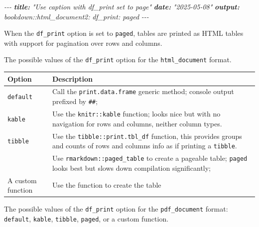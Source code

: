\documentclass[
  a4paper,
  twoside,
  openright]{book}
\newenvironment{Shaded}{\begin{snugshade}}{\end{snugshade}}
\newcommand{\AnnotationTok}[1]{\textcolor[rgb]{0.56,0.35,0.01}{\textbf{\textit{#1}}}}
\newcommand{\CommentTok}[1]{\textcolor[rgb]{0.56,0.35,0.01}{\textit{#1}}}
\theoremstyle{definition}
\theoremstyle{definition}
\theoremstyle{definition}
\theoremstyle{definition}
\theoremstyle{remark}
\begin{document}
\begin{Shaded}
\begin{Highlighting}[]
\CommentTok{{-}{-}{-}}
\AnnotationTok{title:}\CommentTok{ "Use caption with df\_print set to page"}
\AnnotationTok{date:}\CommentTok{ "2025{-}05{-}08"}
\AnnotationTok{output:}
\CommentTok{  bookdown::html\_document2:}
\CommentTok{    df\_print: paged}
\CommentTok{{-}{-}{-}}
\end{Highlighting}
\end{Shaded}

When the \texttt{df\_print} option is set to \texttt{paged}, tables are printed as HTML tables with support for pagination over rows and columns.

The possible values of the \texttt{df\_print} option for the \texttt{html\_document} format.

\begin{longtable}[]{@{}
  >{\raggedright\arraybackslash}p{}
  >{\raggedright\arraybackslash}p{}@{}}
\toprule\noalign{}
\begin{minipage}[b]{\linewidth}\raggedright
Option
\end{minipage} & \begin{minipage}[b]{\linewidth}\raggedright
Description
\end{minipage} \\
\midrule\noalign{}
\endhead
\bottomrule\noalign{}
\endlastfoot
\texttt{default} & Call the \texttt{print.data.frame} generic method; console output prefixed by \texttt{\#\#}; \\
\texttt{kable} & Use the \texttt{knitr::kable} function; looks nice but with no navigation for rows and columns, neither column types. \\
\texttt{tibble} & Use the \texttt{tibble::print.tbl\_df} function, this provides groups and counts of rows and columns info as if printing a \texttt{tibble}. \\
{\texttt{paged}} & Use \texttt{rmarkdown::paged\_table} to create a pageable table; \texttt{paged} looks best but slows down compilation significantly; \\
A custom function & Use the function to create the table \\
\end{longtable}

The possible values of the \texttt{df\_print} option for the \texttt{pdf\_document} format: \texttt{default}, \texttt{kable}, \texttt{tibble}, \texttt{paged}, or a custom function.
\end{document}
